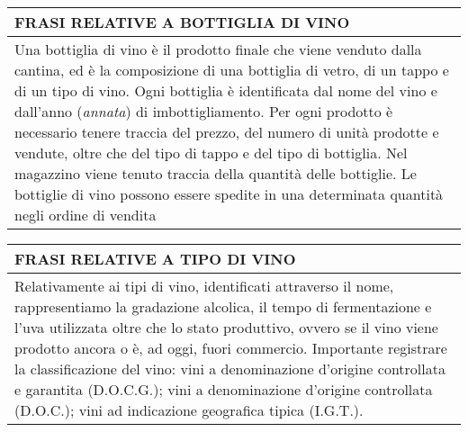 \begin{center}
	\begin{tabular}{P{16cm}}
		\toprule
		 \textbf {\large {FRASI RELATIVE A BOTTIGLIA DI VINO}}                                                                                                                                                                                                                                                                                                                                                                                                                                                                                                     \\
		\midrule
		Una bottiglia di vino è il prodotto finale che viene venduto dalla cantina, ed è la composizione di una bottiglia di vetro, di un tappo e di un tipo di vino. Ogni bottiglia è identificata dal nome del vino e dall'anno (\emph{annata}) di imbottigliamento. Per ogni prodotto è necessario tenere traccia del prezzo, del numero di unità prodotte e vendute, oltre che del tipo di tappo e del tipo di bottiglia. Nel magazzino viene tenuto traccia della quantità delle bottiglie. Le bottiglie di vino possono essere spedite in una determinata quantità negli ordine di vendita \\
		\bottomrule
	\end{tabular}

	\vspace{0.5cm}

	\begin{tabular}{P{16cm}}
		\toprule
		 \textbf {\large {FRASI RELATIVE A TIPO DI VINO}}                                                                                                                                                                                                                                                                                                                                                                                          \\
		\midrule
		Relativamente ai tipi di vino, identificati attraverso il nome, rappresentiamo la gradazione alcolica, il tempo di fermentazione e l'uva utilizzata oltre che lo stato produttivo, ovvero se il vino viene prodotto ancora o è, ad oggi, fuori commercio. Importante registrare la classificazione del vino: vini a denominazione d'origine controllata e garantita (D.O.C.G.); vini a denominazione d'origine controllata (D.O.C.); vini ad indicazione geografica tipica (I.G.T.). \\
		\bottomrule
	\end{tabular}


\end{center}
